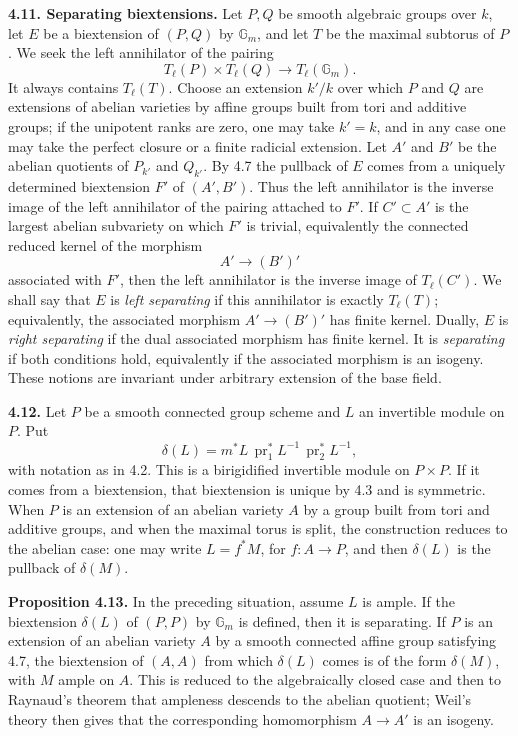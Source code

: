 \documentclass[11pt]{article}
\providecommand{\Gm}{\mathbb G_m}
\providecommand{\pr}{\operatorname{pr}}
\begin{document}
\textbf{4.11. Separating biextensions.}  Let \(P,Q\) be smooth algebraic groups over \(k\), let \(E\) be a biextension of \((P,Q)\) by \(\Gm\), and let \(T\) be the maximal subtorus of \(P\).  We seek the left annihilator of the pairing
\[
  T_\ell(P)\times T_\ell(Q)\longrightarrow T_\ell(\Gm).
\]
It always contains \(T_\ell(T)\).  Choose an extension \(k'/k\) over which \(P\) and \(Q\) are extensions of abelian varieties by affine groups built from tori and additive groups; if the unipotent ranks are zero, one may take \(k'=k\), and in any case one may take the perfect closure or a finite radicial extension.  Let \(A'\) and \(B'\) be the abelian quotients of \(P_{k'}\) and \(Q_{k'}\).  By 4.7 the pullback of \(E\) comes from a uniquely determined biextension \(F'\) of \((A',B')\).  Thus the left annihilator is the inverse image of the left annihilator of the pairing attached to \(F'\).  If \(C'\subset A'\) is the largest abelian subvariety on which \(F'\) is trivial, equivalently the connected reduced kernel of the morphism
\[
  A'\longrightarrow (B')'
\]
associated with \(F'\), then the left annihilator is the inverse image of \(T_\ell(C')\).  We shall say that \(E\) is \emph{left separating} if this annihilator is exactly \(T_\ell(T)\); equivalently, the associated morphism \(A'\to (B')'\) has finite kernel.  Dually, \(E\) is \emph{right separating} if the dual associated morphism has finite kernel.  It is \emph{separating} if both conditions hold, equivalently if the associated morphism is an isogeny.  These notions are invariant under arbitrary extension of the base field.

\textbf{4.12.}  Let \(P\) be a smooth connected group scheme and \(L\) an invertible module on \(P\).  Put
\[
  \delta(L)=m^*L\,\pr_1^*L^{-1}\,\pr_2^*L^{-1},
\]
with notation as in 4.2.  This is a birigidified invertible module on \(P\times P\).  If it comes from a biextension, that biextension is unique by 4.3 and is symmetric.  When \(P\) is an extension of an abelian variety \(A\) by a group built from tori and additive groups, and when the maximal torus is split, the construction reduces to the abelian case: one may write \(L=f^*M\), for \(f:A\to P\), and then \(\delta(L)\) is the pullback of \(\delta(M)\).

\textbf{Proposition 4.13.}  In the preceding situation, assume \(L\) is ample.  If the biextension \(\delta(L)\) of \((P,P)\) by \(\Gm\) is defined, then it is separating.  If \(P\) is an extension of an abelian variety \(A\) by a smooth connected affine group satisfying 4.7, the biextension of \((A,A)\) from which \(\delta(L)\) comes is of the form \(\delta(M)\), with \(M\) ample on \(A\).  This is reduced to the algebraically closed case and then to Raynaud's theorem that ampleness descends to the abelian quotient; Weil's theory then gives that the corresponding homomorphism \(A\to A'\) is an isogeny.
\end{document}
